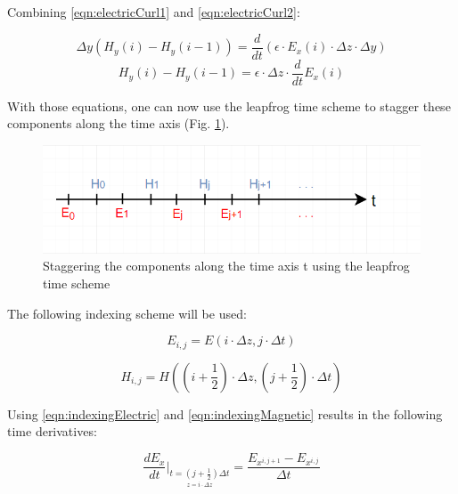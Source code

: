 Combining \ref{eqn:electricCurl1} and \ref{eqn:electricCurl2}:

\begin{equation}
	\label{eqn:electricCurl3}
	\Delta y (H_y(i) - H_y(i-1)) = \frac{d}{dt} (\epsilon \cdot E_x(i) \cdot \Delta z \cdot \Delta y)
\end{equation}
\begin{equation}
	\label{eqn:electricCurl4}
	H_y(i) - H_y(i-1) = \epsilon  \cdot \Delta z  \cdot \frac{d}{dt} E_x(i)
\end{equation}

With those equations, one can now use the leapfrog time scheme to stagger these components along the time axis (Fig. \ref{fig:fdtd1dLeapfrog}).

\begin{figure}[!h]
	\centering
	\includegraphics[scale=0.75]{Figures/fdtd1dLeapfrog}
	\decoRule
	\caption[Leapfrog Time Scheme]{Staggering the components along the time axis t using the leapfrog time scheme}
	\label{fig:fdtd1dLeapfrog}
\end{figure}

The following indexing scheme will be used:

\begin{equation}
	\label{eqn:indexingElectric}
	E_{i,j} = E(i \cdot \Delta z , j \cdot \Delta t)
\end{equation}

\begin{equation}
	\label{eqn:indexingMagnetic}
	H_{i,j} = H((i + \frac{1}{2}) \cdot \Delta z , (j + \frac{1}{2}) \cdot \Delta t)
\end{equation}

Using \ref{eqn:indexingElectric} and \ref{eqn:indexingMagnetic} results in the following time derivatives:

\begin{equation}
	\label{eqn:timeDerivativeE}
	\frac{d E_x}{dt} \bigg\rvert_{\underset{z = i \cdot \Delta z}{t=(j + \frac{1}{2})\Delta t}} = \frac{E_{x^{i,j+1}} - E_{x^{i,j}}}{\Delta t}
\end{equation}

